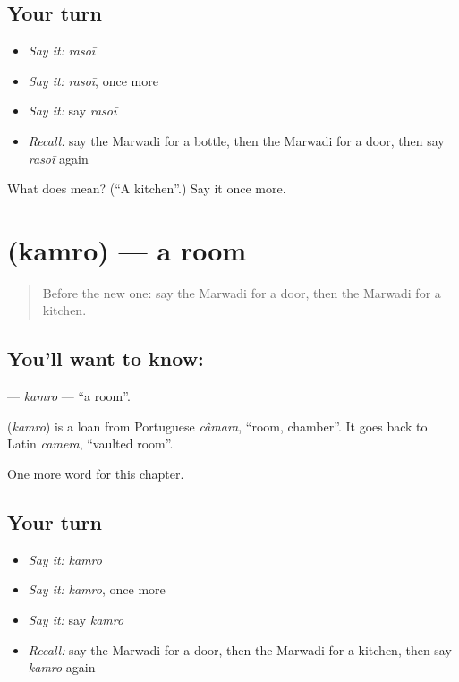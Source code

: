 \subsection*{Your turn}
\begin{itemize}
\raggedright
  \item \emph{Say it:} \emph{rasoī}
  \item \emph{Say it:} \emph{rasoī}, once more
  \item \emph{Say it:} say \emph{rasoī}
  \item \emph{Recall:} say the Marwadi for a bottle, then the Marwadi for a door, then say \emph{rasoī} again
\end{itemize}

\begin{tcolorbox}[breakable,colback=teal!4,colframe=teal!35!black,title={Before you move on}]
What does  mean? (\textquotedblleft{}A kitchen\textquotedblright{}.) Say it once more.
\end{tcolorbox}
\section[\texorpdfstring{\mw{कमरो} (kamro)}{कमरो (kamro)}]{ (kamro) — a room}

\label{lesson:MW-C65-kamro}



\begin{quote}
Before the new one: say the Marwadi for a door, then the Marwadi for a kitchen.
\end{quote}

\subsection*{You'll want to know: }
\textbf{} — \emph{kamro} — \textquotedblleft{}a room\textquotedblright{}.

\begin{cousinweb}
\textbf{} (\emph{kamro}) is a loan from Portuguese \emph{câmara}, \textquotedblleft{}room, chamber\textquotedblright{}. It goes back to Latin \emph{camera}, \textquotedblleft{}vaulted room\textquotedblright{}.
\end{cousinweb}

\begin{grammarlens}[title={What you've built}]
One more word for this chapter.
\end{grammarlens}

\subsection*{Your turn}
\begin{itemize}
\raggedright
  \item \emph{Say it:} \emph{kamro}
  \item \emph{Say it:} \emph{kamro}, once more
  \item \emph{Say it:} say \emph{kamro}
  \item \emph{Recall:} say the Marwadi for a door, then the Marwadi for a kitchen, then say \emph{kamro} again
\end{itemize}

